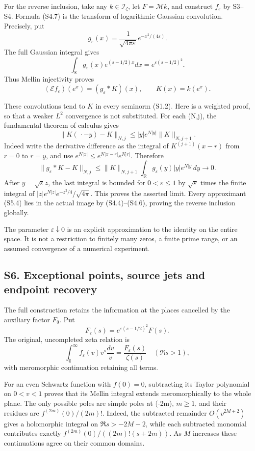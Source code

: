 \documentclass[
]{article}
\begin{document}
For the reverse inclusion, take any \(k\in\mathcal I_\zeta\), let
\(F=\mathcal M k\), and construct \(f_\varepsilon\) by S3--S4. Formula
(S4.7) is the transform of logarithmic Gaussian convolution. Precisely,
put \[
g_\varepsilon(x)=\frac1{\sqrt{4\pi\varepsilon}}
e^{-x^2/(4\varepsilon)}.
\tag{S5.3}
\] The full Gaussian integral gives \[
\int_{\mathbb R}g_\varepsilon(x)e^{(s-1/2)x}dx
=e^{\varepsilon(s-1/2)^2}.
\] Thus Mellin injectivity proves \[
(\mathcal E f_\varepsilon)(e^x)=(g_\varepsilon*K)(x),
\qquad K(x)=k(e^x).
\tag{S5.4}
\]

These convolutions tend to \(K\) in every seminorm (S1.2). Here is a
weighted proof, so that a weaker \(L^2\) convergence is not substituted.
For each (N,j), the fundamental theorem of calculus gives \[
\|K(\,\cdot-y)-K\|_{N,j}
\le |y|e^{N|y|}\|K\|_{N,j+1}.
\tag{S5.5}
\] Indeed write the derivative difference as the integral of
\(K^{(j+1)}(x-r)\) from \(r=0\) to \(r=y\), and use
\(e^{N|x|}\le e^{N|x-r|}e^{N|r|}\). Therefore \[
\|g_\varepsilon*K-K\|_{N,j}
\le\|K\|_{N,j+1}
\int_{\mathbb R}g_\varepsilon(y)|y|e^{N|y|}dy
\longrightarrow0.
\tag{S5.6}
\] After \(y=\sqrt\varepsilon z\), the last integral is bounded for
\(0<\varepsilon\le1\) by \(\sqrt\varepsilon\) times the finite integral
of \(|z|e^{N|z|}e^{-z^2/4}/\sqrt{4\pi}\). This proves the asserted
limit. Every approximant (S5.4) lies in the actual image by
(S4.4)--(S4.6), proving the reverse inclusion globally.

The parameter \(\varepsilon\downarrow0\) is an explicit approximation to
the identity on the entire space. It is not a restriction to finitely
many zeros, a finite prime range, or an assumed convergence of a
numerical experiment.

\subsection{S6. Exceptional points, source jets and endpoint
recovery}\label{s6.-exceptional-points-source-jets-and-endpoint-recovery}

The full construction retains the information at the places cancelled by
the auxiliary factor \(F_0\). Put \[
F_\varepsilon(s)=e^{\varepsilon(s-1/2)^2}F(s).
\] The original, uncompleted zeta relation is \[
\int_0^\infty f_\varepsilon(v)v^s\frac{dv}{v}
=\frac{F_\varepsilon(s)}{\zeta(s)}
\quad(\Re s>1),
\tag{S6.1}
\] with meromorphic continuation retaining all terms.

For an even Schwartz function with \(f(0)=0\), subtracting its Taylor
polynomial on \(0<v<1\) proves that its Mellin integral extends
meromorphically to the whole plane. The only possible poles are simple
poles at (-2m), \(m\ge1\), and their residues are \(f^{(2m)}(0)/(2m)!\).
Indeed, the subtracted remainder \(O(v^{2M+2})\) gives a holomorphic
integral on \(\Re s>-2M-2\), while each subtracted monomial contributes
exactly \(f^{(2m)}(0)/((2m)!(s+2m))\). As \(M\) increases these
continuations agree on their common domains.
\end{document}
